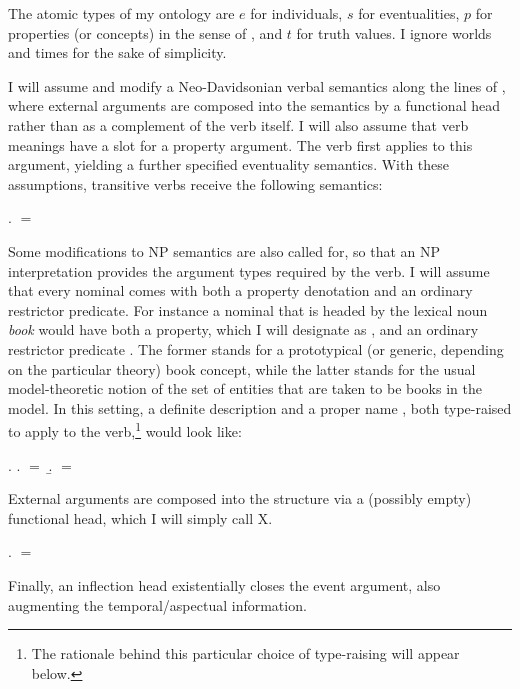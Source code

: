 \documentclass[11pt,a4paper]{article}
\begin{document}
The atomic types of my ontology are $e$ for individuals, $s$ for eventualities, $p$ for properties (or concepts) in the sense of , and $t$ for truth values. I ignore worlds and times for the sake of simplicity.

I will assume and modify a Neo-Davidsonian verbal semantics along the lines of \cite{kratzer96}, where external arguments are composed into the semantics by a functional head rather than as a complement of the verb itself. I will also assume that verb meanings have a slot for a property argument. The verb first applies to this argument, yielding a further specified eventuality semantics. With these assumptions, transitive verbs receive the following semantics:

\ex.  $=$ 

Some modifications to NP semantics are also called for, so that an NP interpretation provides the argument types required by the verb. I will assume that every nominal comes with both a property denotation and an ordinary restrictor predicate. For instance a nominal that is headed by the lexical noun \emph{book} would have both a property, which I will designate as , and an ordinary restrictor predicate . The former stands for a prototypical (or generic, depending on the particular theory) book concept, while the latter stands for the usual model-theoretic notion of the set of entities that are taken to be books in the model. In this setting, a definite description  and a proper name , both type-raised to apply to the verb,\footnote{The rationale behind this particular choice of type-raising will appear below.} would look like:

\ex.\label{exdefprov}
\a.
 $=$  
\b.
 $=$  

External arguments are composed into the structure via a (possibly empty) functional head, which I will simply call X.

\ex.  $=$ 

Finally, an inflection head existentially closes the event argument, also augmenting the temporal/aspectual information.
\end{document}
